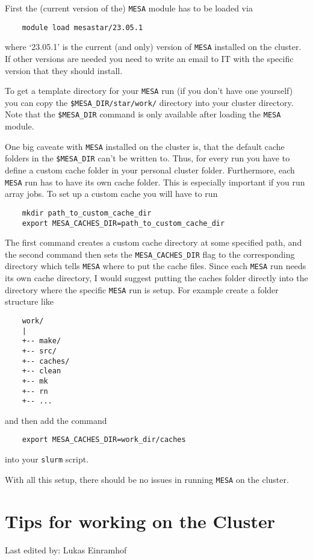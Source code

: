\documentclass{article}
\newcommand{\setlasteditor}[1]{\gdef\lasteditor{#1}}
\newcommand{\lastedited}{%
    \vspace{1mm} {\footnotesize Last edited by: \lasteditor} \vspace{3mm}
    \newline

}
\begin{document}
First the (current version of the) \texttt{MESA} module has to be loaded via
\begin{verbatim}
    module load mesastar/23.05.1
\end{verbatim}
where `23.05.1' is the current (and only) version of \texttt{MESA} installed on the cluster. 
If other versions are needed you need to write an email to IT with the specific version that they should install.

To get a template directory for your \texttt{MESA} run (if you don't have one yourself) you can copy the \texttt{\$MESA\_DIR/star/work/} directory into your cluster directory.
Note that the \texttt{\$MESA\_DIR} command is only available after loading the \texttt{MESA} module.

One big caveate with \texttt{MESA} installed on the cluster is, that the default cache folders in the \texttt{\$MESA\_DIR} can't be written to.
Thus, for every run you have to define a custom cache folder in your personal cluster folder. Furthermore, each \texttt{MESA} run has to have its own cache folder. This is especially important if you run array jobs.
To set up a custom cache you will have to run
\begin{verbatim}
    mkdir path_to_custom_cache_dir
    export MESA_CACHES_DIR=path_to_custom_cache_dir
\end{verbatim}
The first command creates a custom cache directory at some specified path, and the second command then sets the \texttt{MESA\_CACHES\_DIR} flag to the corresponding directory which tells \texttt{MESA} where to put the cache files.
Since each \texttt{MESA} run needs its own cache directory, I would suggest putting the caches folder directly into the directory where the specific \texttt{MESA} run is setup. For example create a folder structure like
\begin{verbatim}
    work/
    |
    +-- make/
    +-- src/
    +-- caches/
    +-- clean
    +-- mk
    +-- rn
    +-- ...
\end{verbatim}
and then add the command
\begin{verbatim}
    export MESA_CACHES_DIR=work_dir/caches
\end{verbatim}
into your \texttt{slurm} script.

With all this setup, there should be no issues in running \texttt{MESA} on the cluster.



\section{Tips for working on the Cluster}
\setlasteditor{Lukas Einramhof}
\lastedited
\end{document}
